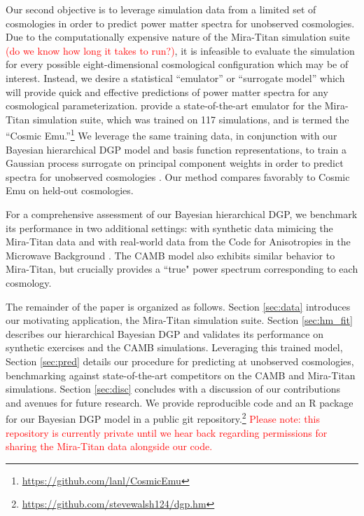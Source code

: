 \documentclass[11pt]{article}
\begin{document}
Our second objective is to leverage simulation data from a limited set of
cosmologies in order to predict power matter spectra for unobserved cosmologies.
Due to the computationally expensive nature of the Mira-Titan simulation suite
\textcolor{red}{(do we know how long it takes to run?)},
it is infeasible to evaluate the simulation for every possible eight-dimensional
cosmological configuration which may be of interest.  Instead, we desire
a statistical ``emulator'' or ``surrogate model'' 
\citep{santner2003design,gramacy2020surrogates} which will provide quick and effective
predictions of power matter spectra for any cosmological parameterization.
\citet{moran2023mira} provide a state-of-the-art emulator for the Mira-Titan
simulation suite, which was trained on 117 simulations, and is termed 
the ``Cosmic Emu.''\footnote{\url{https://github.com/lanl/CosmicEmu}}
We leverage the same training data, in conjunction with our Bayesian hierarchical
DGP model and basis function representations, to train a Gaussian process surrogate 
on principal component weights in order to predict spectra for unobserved
cosmologies \citep{higdon2008computer, higdon2010estcosmo}. 
Our method compares favorably to Cosmic Emu on held-out cosmologies.

For a comprehensive assessment of our Bayesian hierarchical DGP, we benchmark
its performance in two additional settings: with synthetic data mimicing 
the Mira-Titan data and with real-world data from 
the Code for Anisotropies in the Microwave Background \citep[CAMB,][]{lewis2011CAMB}.
The CAMB model also exhibits similar behavior to Mira-Titan, but crucially
provides a ``true" power spectrum corresponding to each cosmology. 

The remainder of the paper is organized as follows.  Section \ref{sec:data} 
introduces our motivating application, the Mira-Titan simulation suite.  
Section \ref{sec:hm_fit} describes our hierarchical Bayesian DGP and 
validates its performance on synthetic exercises and the CAMB simulations.  
Leveraging this trained model, Section \ref{sec:pred} details 
our procedure for predicting at unobserved cosmologies, benchmarking against
state-of-the-art competitors on the CAMB and Mira-Titan simulations. 
Section \ref{sec:disc} concludes with a discussion of our contributions and avenues for 
future research.  We provide reproducible code and an {\sf R} package for our 
Bayesian DGP model in a public git repository.\footnote{\url{https://github.com/stevewalsh124/dgp.hm}}
\textcolor{red}{Please note: this repository is currently private until we 
hear back regarding permissions for sharing the Mira-Titan data alongside our code.}
\end{document}
